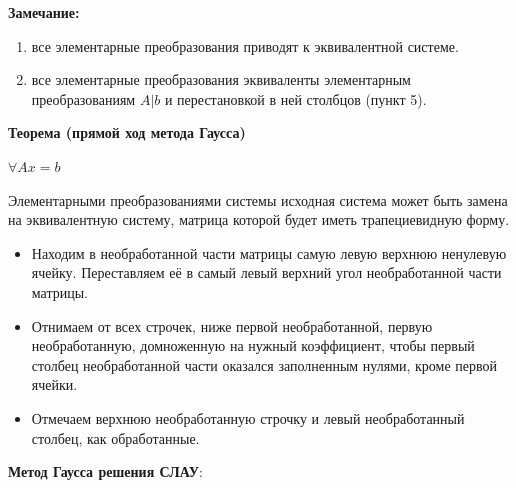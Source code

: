 \documentclass[twoside]{book}
\begin{document}
\textbf{Замечание:}
\begin{enumerate}
    \item все элементарные преобразования приводят к эквивалентной системе.
    \item все элементарные преобразования эквиваленты элементарным преобразованиям \(A | b\) и перестановкой в ней столбцов (пункт 5).
\end{enumerate}

\textbf{Теорема (прямой ход метода Гаусса)}

\(\forall Ax = b\)

Элементарными преобразованиями системы исходная система может быть замена на эквивалентную систему, матрица которой будет иметь трапециевидную форму.

\begin{itemize}
    \item Находим в необработанной части матрицы самую левую верхнюю ненулевую ячейку. Переставляем её в самый левый верхний угол необработанной части матрицы.

    \item Отнимаем от всех строчек, ниже первой необработанной, первую необработанную, домноженную на нужный коэффициент, чтобы первый столбец необработанной части оказался заполненным нулями, кроме первой ячейки.

    \item Отмечаем верхнюю необработанную строчку и левый необработанный столбец, как обработанные.
\end{itemize}

\textbf{Метод Гаусса решения СЛАУ}:
\end{document}
